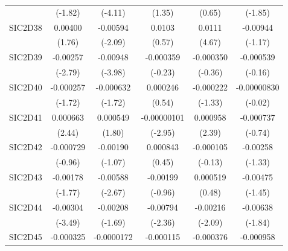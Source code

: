 \begin{table}[htbp]
\begin{tabular}{l*{5}{c}}
            &     (-1.82)         &     (-4.11)         &      (1.35)         &      (0.65)         &     (-1.85)         \\
SIC2D38     &     0.00400         &    -0.00594\sym{*}  &      0.0103         &      0.0111\sym{***}&    -0.00944         \\
            &      (1.76)         &     (-2.09)         &      (0.57)         &      (4.67)         &     (-1.17)         \\
SIC2D39     &    -0.00257\sym{**} &    -0.00948\sym{***}&   -0.000359         &   -0.000350         &   -0.000539         \\
            &     (-2.79)         &     (-3.98)         &     (-0.23)         &     (-0.36)         &     (-0.16)         \\
SIC2D40     &   -0.000257         &   -0.000632         &    0.000246         &   -0.000222         & -0.00000830         \\
            &     (-1.72)         &     (-1.72)         &      (0.54)         &     (-1.33)         &     (-0.02)         \\
SIC2D41     &    0.000663\sym{*}  &    0.000549         & -0.00000101\sym{**} &    0.000958\sym{*}  &   -0.000737         \\
            &      (2.44)         &      (1.80)         &     (-2.95)         &      (2.39)         &     (-0.74)         \\
SIC2D42     &   -0.000729         &    -0.00190         &    0.000843         &   -0.000105         &    -0.00258         \\
            &     (-0.96)         &     (-1.07)         &      (0.45)         &     (-0.13)         &     (-1.33)         \\
SIC2D43     &    -0.00178         &    -0.00588\sym{**} &    -0.00199         &    0.000519         &    -0.00475         \\
            &     (-1.77)         &     (-2.67)         &     (-0.96)         &      (0.48)         &     (-1.45)         \\
SIC2D44     &    -0.00304\sym{***}&    -0.00208         &    -0.00794\sym{*}  &    -0.00216\sym{*}  &    -0.00638         \\
            &     (-3.49)         &     (-1.69)         &     (-2.36)         &     (-2.09)         &     (-1.84)         \\
SIC2D45     &   -0.000325         &  -0.0000172         &   -0.000115         &   -0.000376         &   -0.000958         \\

\end{tabular}
\end{table}
